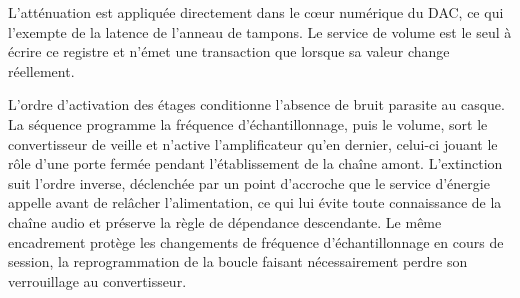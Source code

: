 L'atténuation est appliquée directement dans le cœur numérique du DAC, ce qui l'exempte de la latence de l'anneau de tampons. Le service de volume est le seul à écrire ce registre et n'émet une transaction que lorsque sa valeur change réellement.

L'ordre d'activation des étages conditionne l'absence de bruit parasite au casque. La séquence programme la fréquence d'échantillonnage, puis le volume, sort le convertisseur de veille et n'active l'amplificateur qu'en dernier, celui-ci jouant le rôle d'une porte fermée pendant l'établissement de la chaîne amont. L'extinction suit l'ordre inverse, déclenchée par un point d'accroche que le service d'énergie appelle avant de relâcher l'alimentation, ce qui lui évite toute connaissance de la chaîne audio et préserve la règle de dépendance descendante. Le même encadrement protège les changements de fréquence d'échantillonnage en cours de session, la reprogrammation de la boucle faisant nécessairement perdre son verrouillage au convertisseur.